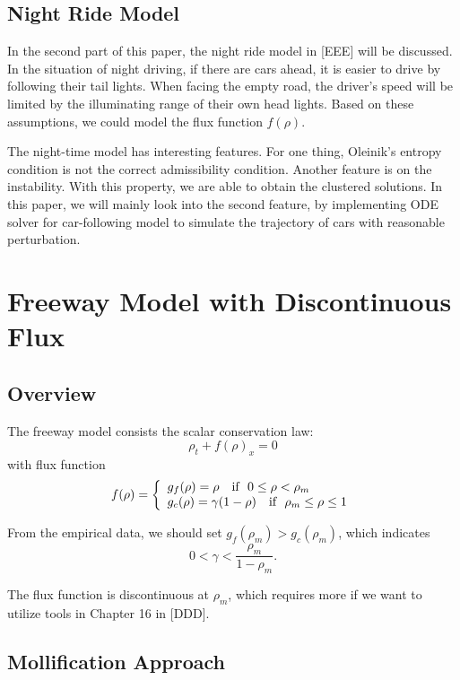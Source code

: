 \documentclass[10pt]{article}
\begin{document}
\subsection{Night Ride Model}

In the second part of this paper, the night ride model in [EEE] will be discussed. In the situation of night driving, if there are cars ahead, it is easier to drive by following their tail lights. When facing the empty road, the driver's speed will be limited by the illuminating range of their own head lights. Based on these assumptions, we could model the flux function $f(\rho)$.

The night-time model has interesting features. For one thing, Oleinik's entropy condition is not the correct admissibility condition. Another feature is on the instability. With this property, we are able to obtain the clustered solutions. In this paper, we will mainly look into the second feature, by implementing ODE solver for car-following model to simulate the trajectory
of cars with reasonable perturbation.
\section{Freeway Model with Discontinuous Flux}
\label{sec:sec2}
\subsection{Overview}

The freeway model consists the scalar conservation law:
\[
\rho_t + f(\rho)_x = 0
\]
with flux function
 \[f(\rho)=\left\{
  \begin{array}{l l}
    g_f(\rho)=\rho \ \ \ \text{if}\ \  0\leq \rho <\rho_m\\
    g_c(\rho)=\gamma(1-\rho) \ \ \ \text{if}\ \ \rho_m\leq\rho\leq 1
  \end{array} \right.\]

  From the empirical data, we should set $g_f(\rho_m)>g_c(\rho_m)$, which indicates
  \[
  0<\gamma<\frac{\rho_m}{1-\rho_m}.
  \]

  The flux function is discontinuous at $\rho_m$, which requires more if we want to utilize tools in Chapter 16 in [DDD].
\subsection{Mollification Approach}
\end{document}
